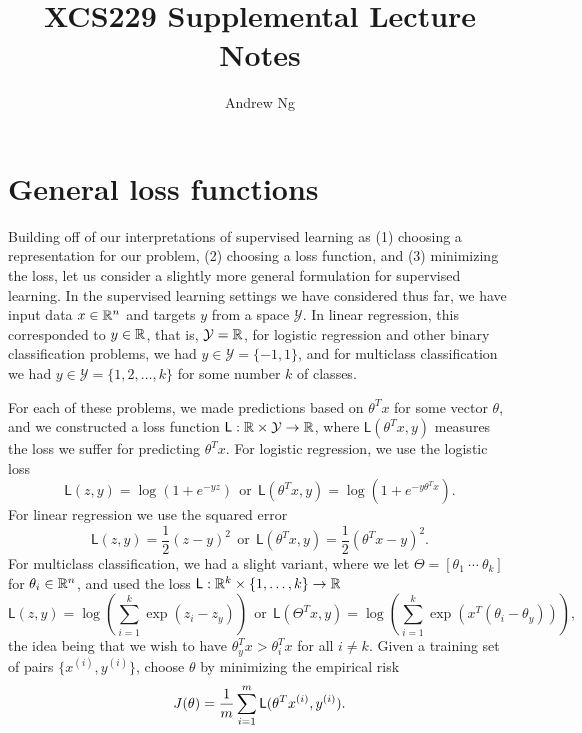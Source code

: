 \documentclass{article}
\newcommand{\loss}{\mathsf{L}}
\newcommand{\mc}[1]{\mathcal{#1}}
\newcommand{\half}{\frac{1}{2}}
\begin{document}
\title{XCS229 Supplemental Lecture Notes}
\author{Andrew Ng}
\date{}
\maketitle

\section{General loss functions}

Building off of our interpretations of supervised learning as (1) choosing a
representation for our problem, (2) choosing a loss function, and (3)
minimizing the loss, let us consider a slightly more general formulation for
supervised learning.  In the supervised learning settings we have considered
thus far, we have input data $x \in \mathbb{R}^n$ and targets $y$ from a space
$\mc{Y}$. In linear regression, this corresponded to $y \in \mathbb{R}$, that is,
$\mc{Y} = \R$, for logistic regression and other binary classification
problems, we had $y \in \mc{Y} = \{-1, 1\}$, and for multiclass
classification we had $y \in \mc{Y} = \{1, 2, \ldots, k\}$ for some number
$k$ of classes.

For each of these problems, we made predictions based on $\theta^T x$ for
some vector $\theta$, and we constructed a loss function $\loss : \R \times
\mc{Y} \to \R$, where $\loss(\theta^T x, y)$ measures the loss we suffer for
predicting $\theta^T x$. For logistic regression, we use the logistic loss
\begin{equation*}
  \loss(z, y) = \log(1 + e^{-y z})
  ~~ \mbox{or} ~~
  \loss(\theta^T x, y) = \log(1 + e^{-y \theta^T x}).
\end{equation*}
For linear regression we use the squared error
\begin{equation*}
  \loss(z, y) = \half (z - y)^2
  ~~ \mbox{or} ~~
  \loss(\theta^T x, y) = \half (\theta^T x - y)^2.
\end{equation*}
For multiclass classification, we had a slight variant, where we let
$\Theta = [\theta_1 ~ \cdots ~ \theta_k]$ for $\theta_i \in \mathbb{R}^n$, and
used the loss $\loss : \R^k \times \{1, \ldots, k\} \to \R$
\begin{equation*}
  \loss(z, y) = \log\left(\sum_{i = 1}^k \exp(z_i - z_y)\right)
  ~~ \mbox{or} ~~
  \loss(\Theta^T x, y) = \log\left(\sum_{i = 1}^k 
  \exp(x^T(\theta_i - \theta_y))\right),
\end{equation*}
the idea being that we wish to have $\theta_y^T x > \theta_i^T x$ for
all $i \neq k$.
Given a training set of pairs $\{x^{(i)}, y^{(i)}\}$, choose $\theta$
by minimizing the empirical risk
\begin{equation}
  \label{eqn:empirical-risk}
  J(\theta) = \frac{1}{m} \sum_{i = 1}^m \loss(\theta^T \xsi, \ysi).
\end{equation}
\end{document}
